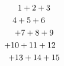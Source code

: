 \documentclass[nofonts]{ctexart}
\begin{document}
\setlength\multlinegap{3em}
\setlength\multlinetaggap{3em}
\begin{multline*}
	1+2+3			\\
	\shoveleft{4+5+6}	\\
	+7+8+9			\\
	\shoveright{+10+11+12}	\\
	+13+14+15
\end{multline*}
\end{document}
